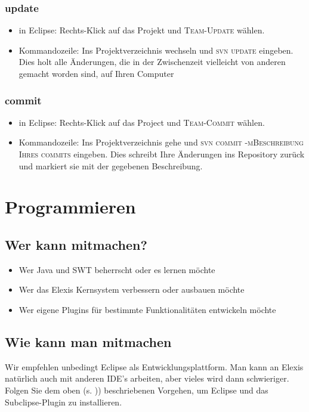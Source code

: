 \subsection{update}
\begin{itemize}
  \item in Eclipse: Rechts-Klick auf das Projekt und \textsc{Team-Update}
  wählen.
  \item Kommandozeile: Ins Projektverzeichnis wechseln und \textsc{svn update}
  eingeben. Dies holt alle Änderungen, die in der Zwischenzeit vielleicht von
  anderen gemacht worden sind, auf Ihren Computer
\end{itemize}
\subsection{commit}
\begin{itemize}
  \item in Eclipse: Rechts-Klick auf das Project und \textsc{Team-Commit}
  wählen.
  \item Kommandozeile: Ins Projektverzeichnis gehe und \textsc{svn commit
  -m\glqq Beschreibung Ihres commits\grqq} eingeben. Dies schreibt Ihre Änderungen
  ins Repository zurück und markiert sie mit der gegebenen Beschreibung.
\end{itemize}


\chapter{Programmieren}
\section{Wer kann mitmachen?}
\begin{itemize}
  \item Wer Java und SWT beherrscht oder es lernen möchte
  \item Wer das Elexis Kernsystem verbessern oder ausbauen möchte
  \item Wer eigene Plugins für bestimmte Funktionalitäten entwickeln möchte
\end{itemize}
\section{Wie kann man mitmachen}
Wir empfehlen unbedingt Eclipse als Ent\-wick\-lungs\-platt\-form. Man kann an Ele\-xis
natür\-lich auch mit anderen IDE's arbeiten, aber vieles wird dann schwieriger.
Folgen Sie dem oben (s. \pageref{Eclipse})) beschriebenen Vorgehen, um Eclipse
und das Subclipse-Plugin zu installieren.

